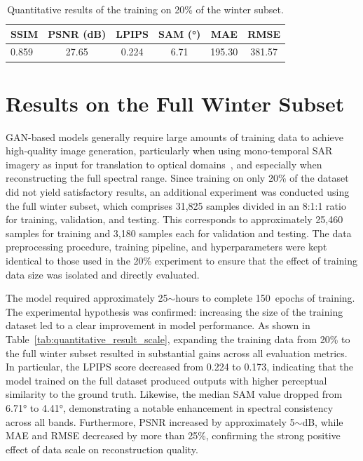 \begin{table}[h!]
\centering
\caption[Quantitative results of 20\% training winter subset]{Quantitative results of the training on 20\% of the winter subset.}
\begin{tabular}{lccccc}
\toprule
\textbf{SSIM} & \textbf{PSNR (dB)} & \textbf{LPIPS} & \textbf{SAM (°)} & \textbf{MAE} & \textbf{RMSE} \\
\midrule
0.859 & 27.65 & 0.224 & 6.71 & 195.30 & 381.57 \\
\bottomrule
\end{tabular}
\label{tab:quantitative_result_20}
\end{table}

\section{Results on the Full Winter Subset}
GAN-based models generally require large amounts of training data to achieve high-quality image generation, particularly when using mono-temporal SAR imagery as input for translation to optical domains~\cite{sar_2_opt_CGAN_survey_taxonomy}, and especially when reconstructing the full spectral range. Since training on only 20\% of the dataset did not yield satisfactory results, an additional experiment was conducted using the full winter subset, which comprises 31,825 samples divided in an 8:1:1 ratio for training, validation, and testing. This corresponds to approximately 25,460 samples for training and 3,180 samples each for validation and testing. The data preprocessing procedure, training pipeline, and hyperparameters were kept identical to those used in the 20\% experiment to ensure that the effect of training data size was isolated and directly evaluated.

The model required approximately 25$\sim$hours to complete 150~epochs of training. The experimental hypothesis was confirmed: increasing the size of the training dataset led to a clear improvement in model performance. As shown in Table~\ref{tab:quantitative_result_scale}, expanding the training data from 20\% to the full winter subset resulted in substantial gains across all evaluation metrics. In particular, the LPIPS score decreased from 0.224 to 0.173, indicating that the model trained on the full dataset produced outputs with higher perceptual similarity to the ground truth. Likewise, the median SAM value dropped from 6.71° to 4.41°, demonstrating a notable enhancement in spectral consistency across all bands. Furthermore, PSNR increased by approximately 5$\sim$dB, while MAE and RMSE decreased by more than 25\%, confirming the strong positive effect of data scale on reconstruction quality.

